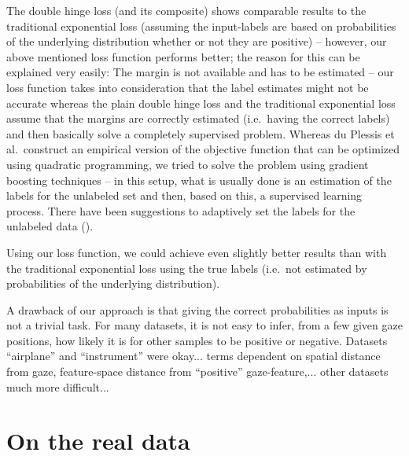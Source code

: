 The double hinge loss (and its composite) shows comparable results to the traditional exponential loss (assuming the input-labels are based on probabilities of the underlying distribution whether or not they are positive) -- however, our above mentioned loss function performs better; the reason for this can be explained very easily: The margin is not available and has to be estimated -- our loss function takes into consideration that the label estimates might not be accurate whereas the plain double hinge loss and the traditional exponential loss assume that the margins are correctly estimated (i.e.\ having the correct labels) and then basically solve a completely supervised problem. 
Whereas du Plessis et al.\ construct an empirical version of the objective function that can be optimized using quadratic programming, we tried to solve the problem using gradient boosting techniques -- in this setup, what is usually done is an estimation of the labels for the unlabeled set and then, based on this, a supervised learning process. 
There have been suggestions to adaptively set the labels for the unlabeled data (). 

Using our loss function, we could achieve even slightly better results than with the traditional exponential loss using the true labels (i.e.\ not estimated by probabilities of the underlying distribution).

A drawback of our approach is that giving the correct probabilities as inputs is not a trivial task. 
For many datasets, it is not easy to infer, from a few given gaze positions, how likely it is for other samples to be positive or negative. Datasets ``airplane'' and ``instrument'' were okay... terms dependent on spatial distance from gaze, feature-space distance from ``positive'' gaze-feature,... other datasets much more difficult...

\section{On the real data}
